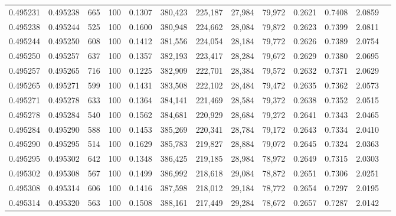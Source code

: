 \begin{tabular}{rrrrrrrrrrrrr}
0.495231 & 0.495238 &   665 & 100 &                                     0.1307 & 380,423 & 225,187 &  27,984 &  79,972 & 0.2621 & 0.7408 & 2.0859 \\
0.495238 & 0.495244 &   525 & 100 &                                     0.1600 & 380,948 & 224,662 &  28,084 &  79,872 & 0.2623 & 0.7399 & 2.0811 \\
0.495244 & 0.495250 &   608 & 100 &                                     0.1412 & 381,556 & 224,054 &  28,184 &  79,772 & 0.2626 & 0.7389 & 2.0754 \\
0.495250 & 0.495257 &   637 & 100 &                                     0.1357 & 382,193 & 223,417 &  28,284 &  79,672 & 0.2629 & 0.7380 & 2.0695 \\
0.495257 & 0.495265 &   716 & 100 &                                     0.1225 & 382,909 & 222,701 &  28,384 &  79,572 & 0.2632 & 0.7371 & 2.0629 \\
0.495265 & 0.495271 &   599 & 100 &                                     0.1431 & 383,508 & 222,102 &  28,484 &  79,472 & 0.2635 & 0.7362 & 2.0573 \\
0.495271 & 0.495278 &   633 & 100 &                                     0.1364 & 384,141 & 221,469 &  28,584 &  79,372 & 0.2638 & 0.7352 & 2.0515 \\
0.495278 & 0.495284 &   540 & 100 &                                     0.1562 & 384,681 & 220,929 &  28,684 &  79,272 & 0.2641 & 0.7343 & 2.0465 \\
0.495284 & 0.495290 &   588 & 100 &                                     0.1453 & 385,269 & 220,341 &  28,784 &  79,172 & 0.2643 & 0.7334 & 2.0410 \\
0.495290 & 0.495295 &   514 & 100 &                                     0.1629 & 385,783 & 219,827 &  28,884 &  79,072 & 0.2645 & 0.7324 & 2.0363 \\
0.495295 & 0.495302 &   642 & 100 &                                     0.1348 & 386,425 & 219,185 &  28,984 &  78,972 & 0.2649 & 0.7315 & 2.0303 \\
0.495302 & 0.495308 &   567 & 100 &                                     0.1499 & 386,992 & 218,618 &  29,084 &  78,872 & 0.2651 & 0.7306 & 2.0251 \\
0.495308 & 0.495314 &   606 & 100 &                                     0.1416 & 387,598 & 218,012 &  29,184 &  78,772 & 0.2654 & 0.7297 & 2.0195 \\
0.495314 & 0.495320 &   563 & 100 &                                     0.1508 & 388,161 & 217,449 &  29,284 &  78,672 & 0.2657 & 0.7287 & 2.0142 \\

\end{tabular}
